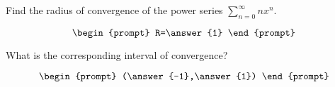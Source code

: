 \documentclass{ximera}
\author{Gregory Hartman \and Matthew Carr}
\begin{document}
\begin{exercise}




Find the radius of convergence of the power series $\sum_{n=0}^{\infty}n x^{n}$.

\[
\begin{prompt}
R=\answer{1}
\end{prompt}
\]

What is the corresponding interval of convergence?

\[
\begin{prompt}
(\answer{-1},\answer{1})
\end{prompt}
\]

\end{exercise}
\end{document}
